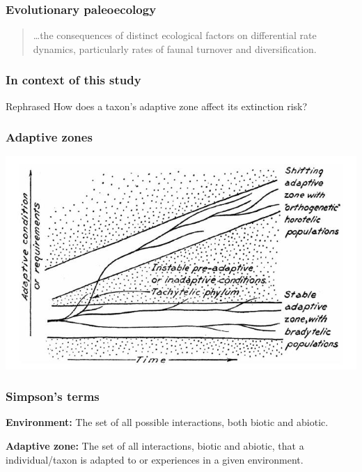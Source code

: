 \documentclass{beamer}
\begin{document}
\begin{frame}
  \frametitle{Evolutionary paleoecology}
  \begin{quotation}
    \dots the consequences of distinct ecological factors on differential rate dynamics, particularly rates of faunal turnover and diversification.

    \tiny{}
  \end{quotation}
\end{frame}

\begin{frame}
  \frametitle{In context of this study}

  \begin{block}{Rephrased}
    How does a taxon's \alert{adaptive zone} affect its \alert{extinction risk?}
  \end{block}
\end{frame}

\begin{frame}
  \frametitle{Adaptive zones}

  \begin{center}
    \includegraphics[height = 0.7\textheight, keepaspectratio = true]{figure/simpson}

    \tiny{}
  \end{center}
\end{frame}

\begin{frame}
  \frametitle{Simpson's terms}

  \begin{definition}
    \textbf{Environment:} The set of all possible interactions, both biotic and abiotic.
  
    \textbf{Adaptive zone:} The set of all interactions, biotic and abiotic, that a individual/taxon is adapted to or experiences in a given environment.
  \end{definition}

  \tiny{}

\end{frame}
\end{document}
